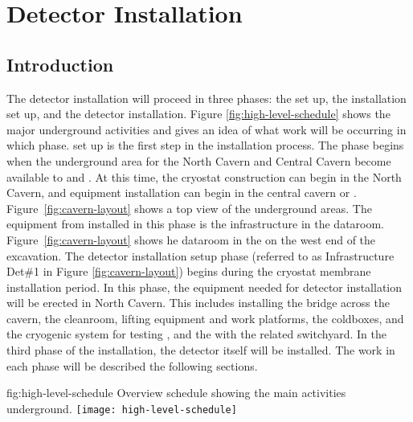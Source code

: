 \section{Detector Installation}
\label{sec:fdsp-tc-inst}

\subsection{Introduction}
\label{sec:fdsp-tc-inst-intro} 

The  detector installation will proceed in three phases: the  set up, the installation set up, and the detector installation. Figure \ref{fig:high-level-schedule} 
shows the major underground activities and gives an idea of what work will be occurring in which phase.  set up is the first step in the installation process. The phase begins when the underground area for the North Cavern and Central Cavern become available to  and . At this time, the cryostat construction can begin in the North Cavern, and  equipment installation can begin in the central cavern or . Figure~\ref{fig:cavern-layout} shows a top view of the underground areas. The equipment from  installed in this phase is the infrastructure in the  dataroom. Figure~\ref{fig:cavern-layout} shows he dataroom in the  on the west end of the excavation. The detector installation setup phase (referred to as Infrastructure Det\#1 in Figure \ref{fig:cavern-layout}) begins during the cryostat membrane installation period. In this phase, the equipment needed for detector installation will be erected in North Cavern. This includes installing the bridge across the cavern, the cleanroom, lifting equipment and work platforms, the coldboxes,  and the cryogenic system for testing , and the  with the related switchyard. In the third phase of the installation, the detector itself will be installed. The work in each phase will be described the following sections.

\begin{dunefigure}{fig:high-level-schedule}
  {Overview schedule showing the main activities underground.}
\texttt{[image: high-level-schedule]}
\end{dunefigure}

